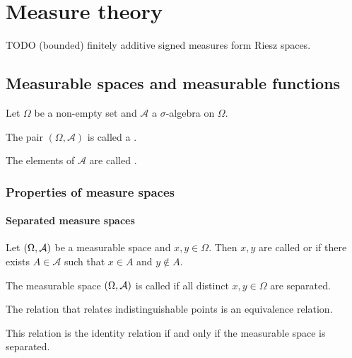 \chapter{Measure theory}
TODO (bounded) finitely additive signed measures form Riesz spaces.

\section{Measurable spaces and measurable functions}
\begin{definition}
Let $\Omega$ be a non-empty set and $\mathcal{A}$ a $\sigma$-algebra on $\Omega$.

The pair $(\Omega, \mathcal{A})$ is called a .

The elements of $\mathcal{A}$ are called .
\end{definition}


\subsection{Properties of measure spaces}
\subsubsection{Separated measure spaces}
\begin{definition}
Let $\sSet{\Omega,\mathcal{A}}$ be a measurable space and $x,y\in \Omega$. Then $x,y$ are called  or  if there exists $A\in \mathcal{A}$ such that $x\in A$ and $y\notin A$.

The measurable space $\sSet{\Omega,\mathcal{A}}$ is called  if all distinct $x,y\in \Omega$ are separated.
\end{definition}

\begin{lemma}
The relation that relates indistinguishable points is an equivalence relation.

This relation is the identity relation \textup{if and only if} the measurable space is separated.
\end{lemma}

